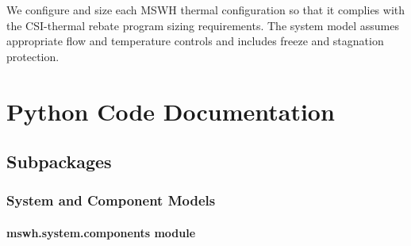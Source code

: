 \documentclass[letterpaper,10pt,english,openany]{sphinxmanual}
\begin{document}
We configure and size each MSWH thermal configuration so that it complies with the CSI-thermal rebate program sizing requirements. The system model assumes appropriate flow and temperature controls and includes freeze and stagnation protection.


\chapter{Python Code Documentation}
\label{\detokenize{source/modules:python-code-documentation}}\label{\detokenize{source/modules::doc}}

\section{Subpackages}
\label{\detokenize{source/modules:subpackages}}

\subsection{System and Component Models}
\label{\detokenize{source/mswh.system:system-and-component-models}}\label{\detokenize{source/mswh.system::doc}}

\subsubsection{mswh.system.components module}
\label{\detokenize{source/mswh.system:module-mswh.system.components}}\label{\detokenize{source/mswh.system:mswh-system-components-module}}
\end{document}
